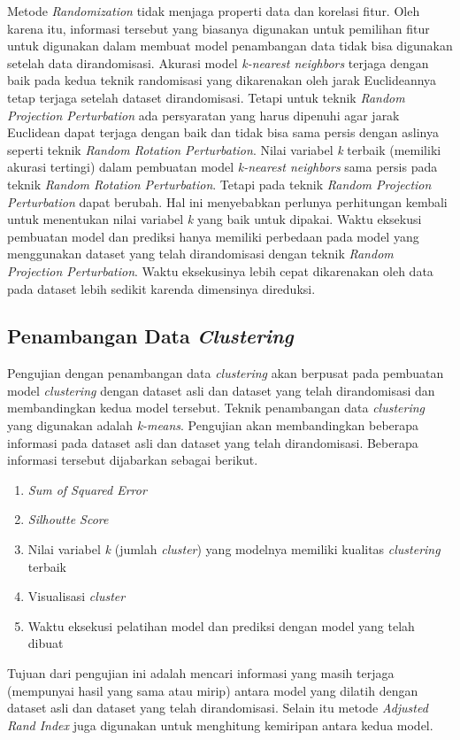 Metode \textit{Randomization} tidak menjaga properti data dan korelasi fitur. Oleh karena itu, informasi tersebut yang biasanya digunakan untuk pemilihan fitur untuk digunakan dalam membuat model penambangan data tidak bisa digunakan setelah data dirandomisasi. Akurasi model \textit{k-nearest neighbors} terjaga dengan baik pada kedua teknik randomisasi yang dikarenakan oleh jarak Euclideannya tetap terjaga setelah dataset dirandomisasi. Tetapi untuk teknik \textit{Random Projection Perturbation} ada persyaratan yang harus dipenuhi agar jarak Euclidean dapat terjaga dengan baik dan tidak bisa sama persis dengan aslinya seperti teknik \textit{Random Rotation Perturbation}. Nilai variabel \textit{k} terbaik (memiliki akurasi tertingi) dalam pembuatan model \textit{k-nearest neighbors} sama persis pada teknik \textit{Random Rotation Perturbation}. Tetapi pada teknik \textit{Random Projection Perturbation} dapat berubah. Hal ini menyebabkan perlunya perhitungan kembali untuk menentukan nilai variabel \textit{k} yang baik untuk dipakai. Waktu eksekusi pembuatan model dan prediksi hanya memiliki perbedaan pada model yang menggunakan dataset yang telah dirandomisasi dengan teknik \textit{Random Projection Perturbation}. Waktu eksekusinya lebih cepat dikarenakan oleh data pada dataset lebih sedikit karenda dimensinya direduksi.

\subsection{Penambangan Data \textit{Clustering}}
\label{subsec:pengujian-clustering}

Pengujian dengan penambangan data \textit{clustering} akan berpusat pada pembuatan model \textit{clustering} dengan dataset asli dan dataset yang telah dirandomisasi dan membandingkan kedua model tersebut. Teknik penambangan data \textit{clustering} yang digunakan adalah \textit{k-means}. Pengujian akan membandingkan beberapa informasi pada dataset asli dan dataset yang telah dirandomisasi. Beberapa informasi tersebut dijabarkan sebagai berikut.
\begin{enumerate}
	\item \textit{Sum of Squared Error}
	\item \textit{Silhoutte Score}
	\item Nilai variabel \textit{k} (jumlah \textit{cluster}) yang modelnya memiliki kualitas \textit{clustering} terbaik
	\item Visualisasi \textit{cluster}
	\item Waktu eksekusi pelatihan model dan prediksi dengan model yang telah dibuat
\end{enumerate}
Tujuan dari pengujian ini adalah mencari informasi yang masih terjaga (mempunyai hasil yang sama atau mirip) antara model yang dilatih dengan dataset asli dan dataset yang telah dirandomisasi. Selain itu metode \textit{Adjusted Rand Index} juga digunakan untuk menghitung kemiripan antara kedua model.


